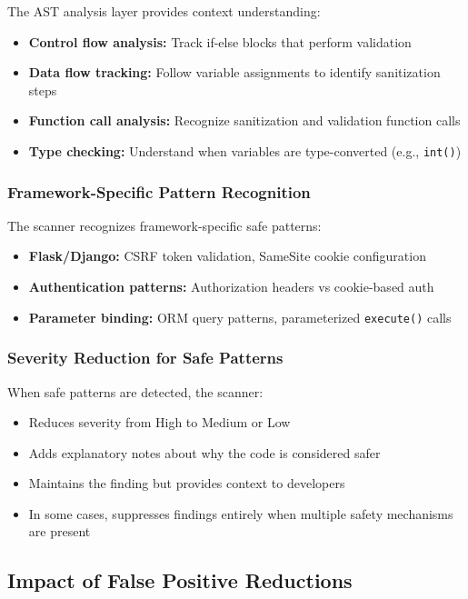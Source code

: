 The AST analysis layer provides context understanding:
\begin{itemize}
	\item \textbf{Control flow analysis:} Track if-else blocks that perform validation
	\item \textbf{Data flow tracking:} Follow variable assignments to identify sanitization steps
	\item \textbf{Function call analysis:} Recognize sanitization and validation function calls
	\item \textbf{Type checking:} Understand when variables are type-converted (e.g., \texttt{int()})
\end{itemize}

\subsubsection{Framework-Specific Pattern Recognition}
\label{sec:fp_framework_patterns}

The scanner recognizes framework-specific safe patterns:
\begin{itemize}
	\item \textbf{Flask/Django:} CSRF token validation, SameSite cookie configuration
	\item \textbf{Authentication patterns:} Authorization headers vs cookie-based auth
	\item \textbf{Parameter binding:} ORM query patterns, parameterized \texttt{execute()} calls
\end{itemize}

\subsubsection{Severity Reduction for Safe Patterns}
\label{sec:fp_severity_reduction}

When safe patterns are detected, the scanner:
\begin{itemize}
	\item Reduces severity from High to Medium or Low
	\item Adds explanatory notes about why the code is considered safer
	\item Maintains the finding but provides context to developers
	\item In some cases, suppresses findings entirely when multiple safety mechanisms are present
\end{itemize}

\subsection{Impact of False Positive Reductions}
\label{sec:fp_impact}

